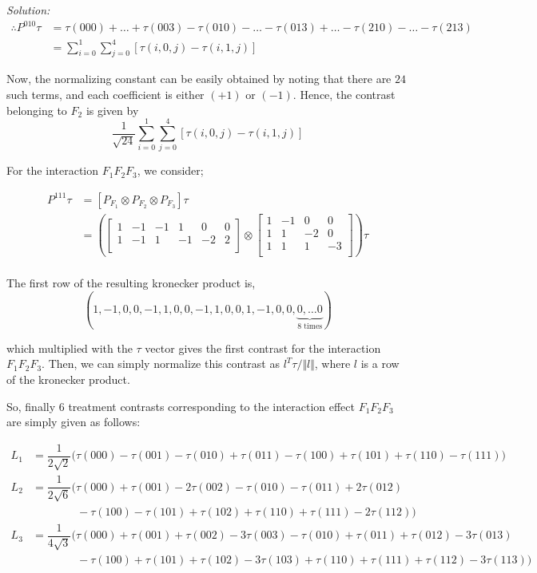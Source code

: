 \documentclass[12pt]{article}
\theoremstyle{definition}
\newenvironment{answer}{\textit{Solution: }\quad }{ \hfill \qedsymbol}
\begin{document}
\begin{answer}
	\begin{align*}
		\therefore P^{010}\tau	
		& = \tau(000) + \dots +\tau(003) - \tau(010) - \dots - \tau(013) + \ldots - \tau(210) - \dots - \tau(213)\\
		& = \sum_{i = 0}^{1} \sum_{j = 0}^{4} \left[ \tau(i,0,j) - \tau(i, 1, j) \right]
	\end{align*}

	Now, the normalizing constant can be easily obtained by noting that there are $24$ such terms, and each coefficient is either $(+1)$ or $(-1)$. Hence, the contrast belonging to $F_2$ is given by $$\dfrac{1}{\sqrt{24}} \sum_{i = 0}^{1} \sum_{j = 0}^{4} \left[ \tau(i,0,j) - \tau(i, 1, j) \right]$$

	For the interaction $F_1F_2F_3$, we consider;

	\begin{align*}
		P^{111}\tau
		& = \left[ P_{F_1} \otimes P_{F_2} \otimes P_{F_3} \right] \tau \\
		& = \left( \begin{bmatrix}
			1 & -1 & -1 & 1 & 0 & 0\\
			1 & -1 & 1 & -1 & -2 & 2\\
		\end{bmatrix} \otimes 
		\begin{bmatrix}
			1 & -1 & 0 & 0\\
			1 & 1 & -2 & 0\\
			1 & 1 & 1 & -3\\
		\end{bmatrix} \right) \tau\\
	\end{align*}

	The first row of the resulting kronecker product is, $$(1, -1, 0, 0, -1, 1, 0, 0, -1, 1, 0, 0, 1, -1, 0, 0, \underbrace{0, \dots 0}_{8 \text{ times}})$$

	which multiplied with the $\tau$ vector gives the first contrast for the interaction $F_1F_2F_3$. Then, we can simply normalize this contrast as $l^T\tau / \Vert l \Vert$, where $l$ is a row of the kronecker product.

	So, finally $6$ treatment contrasts corresponding to the interaction effect $F_1F_2F_3$ are simply given as follows:

	\begin{align*}
		L_1 & = \dfrac{1}{2\sqrt{2}} \Big(  \tau(000) - \tau(001) - \tau(010) + \tau(011) - \tau(100) + \tau(101) + \tau(110) - \tau(111)  \Big) \\
		L_2 & = \dfrac{1}{2\sqrt{6}} \Big( \tau(000) + \tau(001) - 2\tau(002) - \tau(010) - \tau(011) + 2\tau(012) \\
		& \qquad \qquad  - \tau(100) - \tau(101) + \tau(102) + \tau(110) + \tau(111) - 2\tau(112) \Big)\\
		L_3 & = \dfrac{1}{4\sqrt{3}} \Big(
			  \tau(000) + \tau(001) + \tau(002) - 3 \tau(003)
			- \tau(010) + \tau(011) + \tau(012) - 3 \tau(013) \\
		& \qquad \qquad
			- \tau(100) + \tau(101) + \tau(102) - 3 \tau(103) 
			+ \tau(110) + \tau(111) + \tau(112) - 3 \tau(113) 
		\Big)
	\end{align*}


\end{answer}
\end{document}
